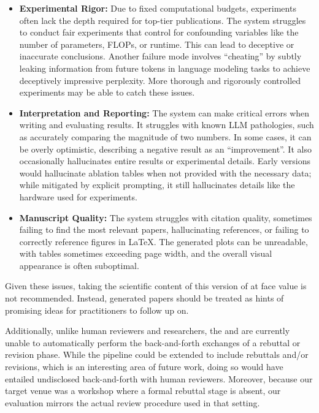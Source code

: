 \begin{appendices}
\begin{itemize}
    \item \textbf{Experimental Rigor:} Due to fixed computational budgets, experiments often lack the depth required for top-tier publications. The system struggles to conduct fair experiments that control for confounding variables like the number of parameters, FLOPs, or runtime. This can lead to deceptive or inaccurate conclusions.
    Another failure mode involves ``cheating'' by subtly leaking information from future tokens in language modeling tasks to achieve deceptively impressive perplexity. More thorough and rigorously controlled experiments may be able to catch these issues.

    \item \textbf{Interpretation and Reporting:} The system can make critical errors when writing and evaluating results. It struggles with known LLM pathologies, such as accurately comparing the magnitude of two numbers. In some cases, it can be overly optimistic, describing a negative result as an ``improvement''. It also occasionally hallucinates entire results or experimental details. Early versions would hallucinate ablation tables when not provided with the necessary data; while mitigated by explicit prompting, it still hallucinates details like the hardware used for experiments.

    \item \textbf{Manuscript Quality:} The system struggles with citation quality, sometimes failing to find the most relevant papers, hallucinating references, or failing to correctly reference figures in LaTeX. The generated plots can be unreadable, with tables sometimes exceeding page width, and the overall visual appearance is often suboptimal.

\end{itemize}
Given these issues, taking the scientific content of this version of \ouralgo at face value is not recommended. Instead, generated papers should be treated as hints of promising ideas for practitioners to follow up on.

Additionally, unlike human reviewers and researchers, the \ourreviewer and \ouralgo are currently unable to automatically perform the back-and-forth exchanges of a rebuttal or revision phase.
While the pipeline could be extended to include rebuttals and/or revisions, which is an interesting area of future work, doing so would have entailed undisclosed back-and-forth with human reviewers. Moreover, because our target venue was a workshop where a formal rebuttal stage is absent, our evaluation mirrors the actual review procedure used in that setting.


\end{appendices}
